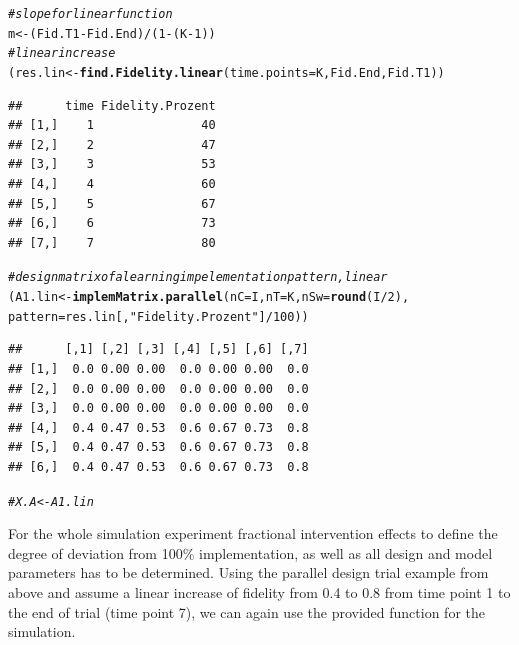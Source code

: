 \documentclass{article}\usepackage[]{graphicx}\usepackage[]{color}
\makeatletter
\newcommand{\hlnum}[1]{\textcolor[rgb]{0.686,0.059,0.569}{#1}}%
\newcommand{\hlstr}[1]{\textcolor[rgb]{0.192,0.494,0.8}{#1}}%
\newcommand{\hlcom}[1]{\textcolor[rgb]{0.678,0.584,0.686}{\textit{#1}}}%
\newcommand{\hlopt}[1]{\textcolor[rgb]{0,0,0}{#1}}%
\newcommand{\hlstd}[1]{\textcolor[rgb]{0.345,0.345,0.345}{#1}}%
\newcommand{\hlkwb}[1]{\textcolor[rgb]{0.69,0.353,0.396}{#1}}%
\newcommand{\hlkwc}[1]{\textcolor[rgb]{0.333,0.667,0.333}{#1}}%
\newcommand{\hlkwd}[1]{\textcolor[rgb]{0.737,0.353,0.396}{\textbf{#1}}}%
\newenvironment{kframe}{%
 \def\at@end@of@kframe{}%
 \ifinner\ifhmode%
  \def\at@end@of@kframe{\end{minipage}}%
  \begin{minipage}{\columnwidth}%
 \fi\fi%
 \def\FrameCommand##1{\hskip\@totalleftmargin \hskip-\fboxsep
 \colorbox{shadecolor}{##1}\hskip-\fboxsep
     \hskip-\linewidth \hskip-\@totalleftmargin \hskip\columnwidth}%
 \MakeFramed {\advance\hsize-\width
   \@totalleftmargin\z@ \linewidth\hsize
   \@setminipage}}%
 {\par\unskip\endMakeFramed%
 \at@end@of@kframe}
\newenvironment{knitrout}{}{} %
\makeatother
\begin{document}
\begin{knitrout}
\begin{kframe}
\begin{alltt}
\hlcom{#slope for linear function}
\hlstd{m}\hlkwb{<-}\hlstd{(Fid.T1}\hlopt{-}\hlstd{Fid.End)}\hlopt{/}\hlstd{(}\hlnum{1}\hlopt{-}\hlstd{(K}\hlopt{-}\hlnum{1}\hlstd{))}
\hlcom{#linear increase}
\hlstd{(res.lin}\hlkwb{<-}\hlkwd{find.Fidelity.linear}\hlstd{(}\hlkwc{time.points}\hlstd{=K, Fid.End, Fid.T1))}
\end{alltt}
\begin{verbatim}
##      time Fidelity.Prozent
## [1,]    1               40
## [2,]    2               47
## [3,]    3               53
## [4,]    4               60
## [5,]    5               67
## [6,]    6               73
## [7,]    7               80
\end{verbatim}
\begin{alltt}
\hlcom{# design matrix of a learning impelementation pattern, linear}
\hlstd{(A1.lin} \hlkwb{<-}\hlkwd{implemMatrix.parallel}\hlstd{(}\hlkwc{nC}\hlstd{=I,} \hlkwc{nT}\hlstd{=K,} \hlkwc{nSw}\hlstd{=}\hlkwd{round}\hlstd{(I}\hlopt{/}\hlnum{2}\hlstd{),}
                                \hlkwc{pattern}\hlstd{=res.lin[,}\hlstr{"Fidelity.Prozent"}\hlstd{]}\hlopt{/}\hlnum{100}\hlstd{))}
\end{alltt}
\begin{verbatim}
##      [,1] [,2] [,3] [,4] [,5] [,6] [,7]
## [1,]  0.0 0.00 0.00  0.0 0.00 0.00  0.0
## [2,]  0.0 0.00 0.00  0.0 0.00 0.00  0.0
## [3,]  0.0 0.00 0.00  0.0 0.00 0.00  0.0
## [4,]  0.4 0.47 0.53  0.6 0.67 0.73  0.8
## [5,]  0.4 0.47 0.53  0.6 0.67 0.73  0.8
## [6,]  0.4 0.47 0.53  0.6 0.67 0.73  0.8
\end{verbatim}
\begin{alltt}
\hlcom{#X.A<-A1.lin}
\end{alltt}
\end{kframe}
\end{knitrout}

For the whole simulation experiment fractional intervention effects to define the degree of deviation from 100\% implementation, as well as all design and model parameters has to be determined. Using the parallel design trial example from above and assume a linear increase of fidelity from 0.4 to 0.8 from time point 1 to the end of trial (time point 7), we can again use the provided function for the simulation.
\end{document}
